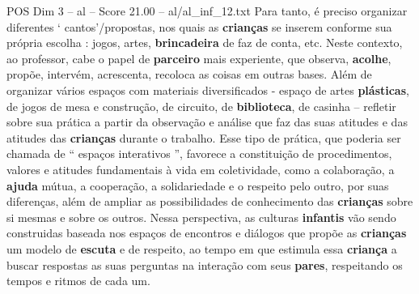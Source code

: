 \begin{textsample}{POS Dim 3 – al – Score 21.00 – al/al\_inf\_12.txt}
Para tanto, é preciso organizar diferentes ‘ cantos’/propostas, nos quais as \textbf{crianças} se inserem conforme sua própria escolha : jogos, artes, \textbf{brincadeira} de faz de conta, etc.
Neste contexto, ao professor, cabe o papel de \textbf{parceiro} mais experiente, que observa, \textbf{acolhe}, propõe, intervém, acrescenta, recoloca as coisas em outras bases.
Além de organizar vários espaços com materiais diversificados - espaço de artes \textbf{plásticas}, de jogos de mesa e construção, de circuito, de \textbf{biblioteca}, de casinha – refletir sobre sua prática a partir da observação e análise que faz das suas atitudes e das atitudes das \textbf{crianças} durante o trabalho.
Esse tipo de prática, que poderia ser chamada de “ espaços interativos ”, favorece a constituição de procedimentos, valores e atitudes fundamentais à vida em coletividade, como a colaboração, a \textbf{ajuda} mútua, a cooperação, a solidariedade e o respeito pelo outro, por suas diferenças, além de ampliar as possibilidades de conhecimento das \textbf{crianças} sobre si mesmas e sobre os outros.
Nessa perspectiva, as culturas \textbf{infantis} vão sendo construidas baseada nos espaços de encontros e diálogos que propõe as \textbf{crianças} um modelo de \textbf{escuta} e de respeito, ao tempo em que estimula essa \textbf{criança} a buscar respostas as suas perguntas na interação com seus \textbf{pares}, respeitando os tempos e ritmos de cada um.

\end{textsample}
